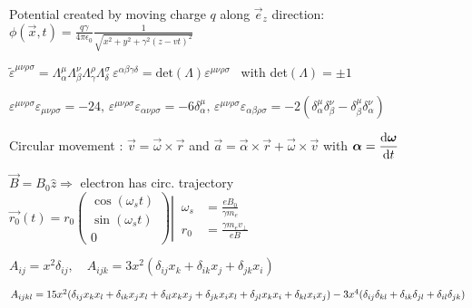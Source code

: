 \begin{squishlist}
\item Potential created by moving charge $q$ along $\vec{e}_z$ direction:\\
$\phi(\vec{x},t)=\frac{q\gamma}{4\pi\epsilon_0}\frac{1}{\sqrt{x^2+y^2+\gamma^2(z-vt)^2}}$


\item$\tilde{\varepsilon}^{\mu\nu\rho\sigma} = \Lambda^{\mu}_{\alpha}\Lambda^{\nu}_{\beta}\Lambda^{\rho}_{\gamma}\Lambda^{\sigma}_{\delta} \, \varepsilon^{\alpha\beta\gamma\delta} = \text{det}(\Lambda)\varepsilon^{\mu\nu\rho\sigma}$ \, with det$(\Lambda) = \pm 1$

\item$\varepsilon^{\mu\nu\rho\sigma}\varepsilon_{\mu\nu\rho\sigma} = -24, \, \varepsilon^{\mu\nu\rho\sigma}\varepsilon_{\alpha\nu\rho\sigma} = -6\delta^{\mu}_{\alpha}, \, \varepsilon^{\mu\nu\rho\sigma}\varepsilon_{\alpha\beta\rho\sigma} = -2(\delta^{\mu}_{\alpha}\delta^{\nu}_{\beta} - \delta^{\mu}_{\beta}\delta^{\nu}_{\alpha})$

\item Circular movement : $\vec{v} = \vec{\omega} \times \vec{r}$ and $\vec{a} = \vec{\alpha} \times \vec{r} + \vec{\omega} \times \vec{v}$ with $\mbox{\boldmath$\alpha$} = \dfrac{\textrm{d} \mbox{\boldmath$\omega$}}{\textrm{d} t}$
\item $\vec{B} = B_0 \hat{z} \Rightarrow $ electron has circ. trajectory $\vec{r_0}(t) = r_0 \begin{pmatrix} \cos(\omega_s t) \\ \sin(\omega_s t) \\ 0 \end{pmatrix}
\left|\,
\begin{aligned}
	\omega_s &= \frac{e B_0}{\gamma m_e} \\ r_0 &= \frac{\gamma m_e v_{\perp}}{e B}
\end{aligned}\right.$
	

\item $A_{ij} = x^2 \delta_{ij}, \quad A_{ijk} = 3x^2(\delta_{ij}x_k + \delta_{ik}x_j + \delta_{jk}x_i)$

\item $A_{ijkl} = 15x^2(\delta_{ij}x_kx_l + \delta_{ik}x_jx_l + \delta_{il}x_kx_j + \delta_{jk}x_ix_l + \delta_{jl}x_kx_i + \delta_{kl}x_ix_j) -\\
3x^4(\delta_{ij}\delta_{kl} + \delta_{ik}\delta_{jl} + \delta_{il}\delta_{jk})$


\end{squishlist}
